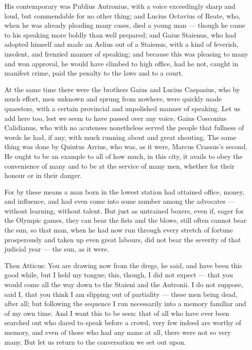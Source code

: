 His contemporary was Publius Autronius, with a voice exceedingly sharp and loud, but commendable for no other thing; and Lucius Octavius of Reate, who, when he was already pleading many cases, died a young man — though he came to his speaking more boldly than well prepared; and Gaius Staienus, who had adopted himself and made an Aelius out of a Staienus, with a kind of feverish, insolent, and frenzied manner of speaking; and because this was pleasing to many and won approval, he would have climbed to high office, had he not, caught in manifest crime, paid the penalty to the laws and to a court.

 At the same time there were the brothers Gaius and Lucius Caepasius, who by much effort, men unknown and sprung from nowhere, were quickly made quaestors, with a certain provincial and unpolished manner of speaking. Let us add here too, lest we seem to have passed over any voice, Gaius Cosconius Calidianus, who with no acuteness nonetheless served the people that fullness of words he had, if any, with much running about and great shouting. The same thing was done by Quintus Arrius, who was, as it were, Marcus Crassus's second. He ought to be an example to all of how much, in this city, it avails to obey the convenience of many and to be at the service of many men, whether for their honour or in their danger.

 For by these means a man born in the lowest station had attained office, money, and influence, and had even come into some number among the advocates — without learning, without talent. But just as untrained boxers, even if, eager for the Olympic games, they can bear the fists and the blows, still often cannot bear the sun, so that man, when he had now run through every stretch of fortune prosperously and taken up even great labours, did not bear the severity of that judicial year — the sun, as it were.

 Then Atticus: You are drawing now from the dregs, he said, and have been this good while, but I held my tongue; this, though, I did not expect — that you would come all the way down to the Staieni and the Autronii. I do not suppose, said I, that you think I am slipping out of partiality — these men being dead, after all; but following the sequence I run necessarily into a memory familiar and of my own time. And I want this to be seen: that of all who have ever been searched out who dared to speak before a crowd, very few indeed are worthy of memory, and even of those who had any name at all, there were not so very many. But let us return to the conversation we set out upon.

